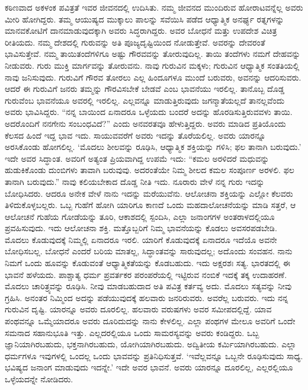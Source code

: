 ಕಠಿಣವಾದ ಅಕಳಂಕ ಪವಿತ್ರತೆ ಇವರ ಜೀವನದಲ್ಲಿ ಉದಿಸಿತು. ನಮ್ಮ ಜೀವನದ ಮುಂದಿರುವ ಹೋರಾಟವನ್ನೆಲ್ಲ ಅವರು ಮೀರಿ ಹೋಗಿದ್ದರು. ತಮ್ಮ ಆಯುಷ್ಯದ ಮುಕ್ಕಾಲು ಪಾಲನ್ನು ಸವೆಯಿಸಿ ಪಡೆದ ಆಧ್ಯಾತ್ಮಿಕ ಅನರ್ಘ್ಯ ರತ್ನಗಳನ್ನು ಮಾನವಕೋಟಿಗೆ ದಾನಮಾಡುವುದಕ್ಕಾಗಿ ಅವರು ಸಿದ್ಧರಾಗಿದ್ದರು. ಅವರ ಬೋಧನೆ ಮತ್ತು ಉಪದೇಶ ವಿಚಿತ್ರ ರೀತಿಯದು. ನಮ್ಮ ದೇಶದಲ್ಲಿ ಗುರುವನ್ನು ಅತಿ ಪೂಜ್ಯದೃಷ್ಟಿಯಿಂದ ನೋಡುತ್ತೇವೆ. ಅವರನ್ನು ದೇವರಂತೆ ಭಾವಿಸುತ್ತೇವೆ. ನಮ್ಮ ತಾಯಿತಂದೆಗಳಿಗೂ ಅಷ್ಟು ಗೌರವವನ್ನು ತೋರುವುದಿಲ್ಲ. ತಾಯಿ ತಂದೆಗಳು ನಮಗೆ ದೇಹವನ್ನು ನೀಡುವರು. ಗುರು ಮುಕ್ತಿ ಮಾರ್ಗವನ್ನು ತೋರುವನು. ನಾವು ಗುರುವಿನ ಮಕ್ಕಳು; ಗುರುವಿನ ಆಧ್ಯಾತ್ಮಿಕ ಸಂತತಿಯಲ್ಲಿ ನಾವು ಜನಿಸುವುದು. ಗುರುವಿಗೆ ಗೌರವ ತೋರಲು ಎಲ್ಲ ಹಿಂದೂಗಳೂ ಮುಂದೆ ಬರುವರು, ಅವನನ್ನು ಆದರಿಸುವರು. ಆದರೆ ಈ ಗುರುವಿಗೆ ಜನರು ತಮ್ಮನ್ನು ಗೌರವಿಸಬೇಕೆ ಬೇಡವೆ ಎಂಬ ಭಾವನೆಯು ಇರಲಿಲ್ಲ. ತಾನೊಬ್ಬ ದೊಡ್ಡ ಗುರುವೆಂಬ ಭಾವನೆಯೂ ಅವರಲ್ಲಿ ಇರಲಿಲ್ಲ. ಎಲ್ಲವನ್ನೂ ಮಾಡುತ್ತಿರುವುದು ಜಗನ್ಮಾತೆಯಲ್ಲದೆ ತಾನಲ್ಲವೆಂದು ಅವರು ಭಾವಿಸಿದ್ದರು. “ನನ್ನ ಬಾಯಿಂದ ಏನಾದರೂ ಒಳ್ಳೆಯದು ಬಂದರೆ ಅದನ್ನು ಹೊರಡಿಸುತ್ತಿರುವವಳು ತಾಯಿ. ಅದರೊಂದಿಗೆ ನನಗೇನು ಸಂಬಂಧವಿದೆ?” ಎಂದು ಅನವರತವೂ ಹೇಳುತ್ತಿದ್ದರು. ಅವರು ಮಾಡಿದ ಪ್ರತಿಯೊಂದು ಕೆಲಸದ ಹಿಂದೆ ಇದ್ದ ಭಾವ ಇದು. ಸಾಯುವವರೆಗೆ ಅವರು ಇದನ್ನು ತೊರೆಯಲಿಲ್ಲ. ಅವರು ಯಾರನ್ನೂ ಅರಸಿಕೊಂಡು ಹೋಗಲಿಲ್ಲ. ‘ಮೊದಲು ಶೀಲವನ್ನು ರೂಢಿಸಿ, ಆಧ್ಯಾತ್ಮಿಕ ಶಕ್ತಿಯನ್ನು ಗಳಿಸಿ; ಫಲ ತಾನಾಗಿ ಬರುವುದು.’ ಇದೇ ಅವರ ಸಿದ್ಧಾಂತ. ಅವರಿಗೆ ಅತ್ಯಂತ ಪ್ರಿಯವಾಗಿದ್ದ ಉಪಮೆ ಇದು: “ಕಮಲ ಅರಳಿದರೆ ಮಧುವನ್ನು ಹುಡುಕಿಕೊಂಡು ದುಂಬಿಗಳು ತಾವಾಗಿ ಬರುವುವು. ಅದರಂತೆಯೇ ನಿಮ್ಮ ಶೀಲದ ಕಮಲ ಸಂಪೂರ್ಣ ಅರಳಲಿ. ಫಲ ತಾನಾಗಿ ಬರುವುದು.” ನಾವು ಕಲಿಯಬೇಕಾದ ದೊಡ್ಡ ನೀತಿ ಇದು. ನೂರಾರು ವೇಳೆ ನನ್ನ ಗುರು ಇದನ್ನು ಬೋಧಿಸಿದರು. ಆದರೂ ಅನೇಕ ವೇಳೆ ನಾನು ಇದನ್ನು ಮರೆಯುವೆನು. ಆಲೋಚನಾ ಶಕ್ತಿಯನ್ನು ಎಲ್ಲೋ ಕೆಲವರು ತಿಳಿದುಕೊಳ್ಳಬಲ್ಲರು. ಒಬ್ಬ ಗುಹೆಗೆ ಹೋಗಿ ಯಾರಿಗೂ ಕಾಣದೆ ಒಂದು ಮಹದಾಲೋಚನೆಯನ್ನು ಮಾಡಿ ಸತ್ತರೆ, ಆ ಆಲೋಚನೆ ಗುಹೆಯ ಗೋಡೆಯನ್ನು ತೂರಿ, ಆಕಾಶದಲ್ಲಿ ಸ್ಪಂದಿಸಿ, ಎಲ್ಲಾ ಜನಾಂಗಗಳ ಅಂತರಾಳದಲ್ಲಿಯೂ ಪ್ರವಹಿಸುವುದು. ಇದು ಆಲೋಚನಾ ಶಕ್ತಿ. ಮತ್ತೊಬ್ಬರಿಗೆ ನಿಮ್ಮ ಭಾವನೆಯನ್ನು ಕೊಡಲು ಅವಸರಪಡಬೇಡಿ. ಮೊದಲು ಕೊಡುವುದಕ್ಕೆ ನಿಮ್ಮಲ್ಲಿ ಏನಾದರೂ ಇರಲಿ. ಯಾರಿಗೆ ಕೊಡುವುದಕ್ಕೆ ಏನಾದರೂ ಇದೆಯೊ ಅವನೇ ಬೋಧಿಸಬಲ್ಲ. ಬೋಧನೆ ಎಂದರೆ ಬರಿಯ ಮಾತಲ್ಲ, ಸಿದ್ಧಾಂತವನ್ನು ಸಾರುವುದಲ್ಲ; ಅದೊಂದು ಸಂವಹನ. ನಾನು ನಿಮಗೆ ಒಂದು ಹೂವನ್ನು ಕೊಡುವಂತೆ ಆಧ್ಯಾತ್ಮಿಕತೆಯನ್ನು ಕೊಡಬಹುದು. ಇದು ಅಕ್ಷರಶಃ ಸತ್ಯ. ಭಾರತದಲ್ಲಿ ಈ ಭಾವನೆ ಹಳೆಯದು. ಪಾಶ್ಚಾತ್ಯ ಧರ್ಮ ಪ್ರವರ್ತಕರ ಪರಂಪರೆಯಲ್ಲಿ ಇಟ್ಟಿರುವ ನಂಬಿಕೆ ಇದಕ್ಕೆ ತಕ್ಕ ಉದಾಹರಣೆ. ಮೊದಲು ಚಾರಿತ್ರ್ಯವನ್ನು ರೂಢಿಸಿ. ನೀವು ಮಾಡಬಹುದಾದ ಅತಿ ಪವಿತ್ರ ಕರ್ತವ್ಯ ಅದು. ಮೊದಲು ಸತ್ಯವನ್ನು ನೀವು ಗ್ರಹಿಸಿ. ಅನಂತರ ನಿಮ್ಮಿಂದ ಅದನ್ನು ಪಡೆಯುವುದಕ್ಕೆ ಹಲವಾರು ಜನರಿರುವರು. ಅವರೆಲ್ಲ ಬರುವರು. ಇದು ನನ್ನ ಗುರುವಿನ ದೃಷ್ಟಿ. ಯಾರನ್ನೂ ಅವರು ದೂರಲಿಲ್ಲ. ಹಲವಾರು ವರುಷಗಳು ಅವರ ಸಮೀಪದಲ್ಲಿದ್ದೆ. ಯಾವ ಪಂಥವನ್ನೂ ಒಮ್ಮೆಯಾದರೂ ಅವರು ದೂರಿದುದನ್ನು ನಾನು ಕೇಳಲಿಲ್ಲ. ಎಲ್ಲಾ ಪಂಥಗಳ ಮೇಲೂ ಅವರಿಗೆ ಒಂದೇ ಸಮನಾದ ಸಹಾನುಭೂತಿ ಇತ್ತು. ಎಲ್ಲದರಲ್ಲಿಯೂ ಒಂದು ಸಾಮರಸ್ಯವನ್ನು ಅವರು ಕಂಡಿದ್ದರು. ಒಬ್ಬ ಜ್ಞಾನಿಯಾಗಿರಬಹುದು, ಭಕ್ತನಾಗಿರಬಹುದು, ಯೋಗಿಯಾಗಿರಬಹುದು. ಅದ್ವಿತೀಯ ಕರ್ಮಿಯಾಗಿರಬಹುದು. ಎಲ್ಲಾ ಧರ್ಮಗಳೂ ಇವುಗಳಲ್ಲಿ ಒಂದಲ್ಲ ಒಂದು ಭಾವವನ್ನು ಪ್ರತಿನಿಧಿಸುತ್ತವೆ. ‘ಇವೆಲ್ಲವನ್ನೂ ಒಬ್ಬನೇ ರೂಢಿಸುವುದು ಸಾಧ್ಯ. ಭವಿಷ್ಯದ ಜನಾಂಗ ಮಾಡುವುದು ಇದನ್ನೇ.’ ಇದೇ ಅವರ ಭಾವನೆ. ಅವರು ಯಾರನ್ನೂ ದೂರಲಿಲ್ಲ, ಎಲ್ಲರಲ್ಲಿಯೂ ಒಳ್ಳೆಯದನ್ನೇ ನೋಡಿದರು.

